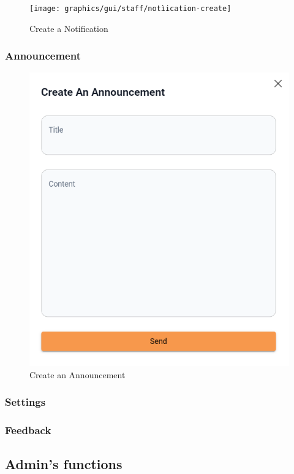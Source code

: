 	
	\begin{figure}[H]
		\centering
		\texttt{[image: graphics/gui/staff/notìication-create]}
		\caption{Create a Notification}
		\label{fig:gui-st-notiication-create}
	\end{figure}
	
	

	
	
	\subsubsection{Announcement}
	\begin{figure}[H]
		\centering
		\includegraphics[width=0.5\linewidth]{graphics/gui/staff/announcement-create}
		\caption{Create an Announcement}
		\label{fig:gui-st-announcement-create}
	\end{figure}
	
	\subsubsection{Settings}
	
	\subsubsection{Feedback}
	
	
\subsection{Admin's functions}
